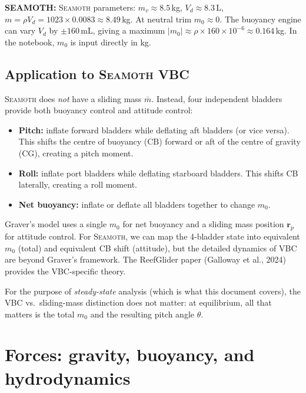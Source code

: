 \documentclass[11pt,a4paper]{article}
\newcommand{\seamoth}{\textsc{Seamoth}}
\newcommand{\vect}[1]{\bm{#1}}
\newcommand{\note}[1]{\par\smallskip\noindent\colorbox{blue!8}{\parbox{\dimexpr\linewidth-2\fboxsep}{%
  \small\textbf{SEAMOTH:} #1}}\smallskip}
\begin{document}
\note{\seamoth{} parameters: $m_v\approx8.5$\,kg, $V_d\approx8.3$\,L,
$m=\rho V_d=1023\times0.0083\approx8.49$\,kg.  At neutral trim $m_0\approx0$.
The buoyancy engine can vary $V_d$ by $\pm160$\,mL, giving a maximum
$|m_0|\approx\rho\times160\times10^{-6}\approx0.164$\,kg.  In the notebook, $m_0$
is input directly in kg.}

\subsection{Application to \seamoth{} VBC}

\seamoth{} does \emph{not} have a sliding mass $\bar{m}$.  Instead, four independent
bladders provide both buoyancy control and attitude control:

\begin{itemize}[nosep]
  \item \textbf{Pitch:} inflate forward bladders while deflating aft bladders (or vice
    versa).  This shifts the centre of buoyancy (CB) forward or aft of the centre of
    gravity (CG), creating a pitch moment.
  \item \textbf{Roll:} inflate port bladders while deflating starboard bladders.
    This shifts CB laterally, creating a roll moment.
  \item \textbf{Net buoyancy:} inflate or deflate all bladders together to change $m_0$.
\end{itemize}

Graver's model uses a single $m_0$ for net buoyancy and a sliding mass position
$\vect{r}_p$ for attitude control.  For \seamoth{}, we can map the 4-bladder state
into equivalent $m_0$ (total) and equivalent CB shift (attitude), but the detailed
dynamics of VBC are beyond Graver's framework.  The ReefGlider paper (Galloway et al.,
2024) provides the VBC-specific theory.

For the purpose of \emph{steady-state} analysis (which is what this document covers),
the VBC vs.\ sliding-mass distinction does not matter: at equilibrium, all that matters
is the total $m_0$ and the resulting pitch angle $\theta$.


\section{Forces: gravity, buoyancy, and hydrodynamics}
\label{sec:forces}
\end{document}
